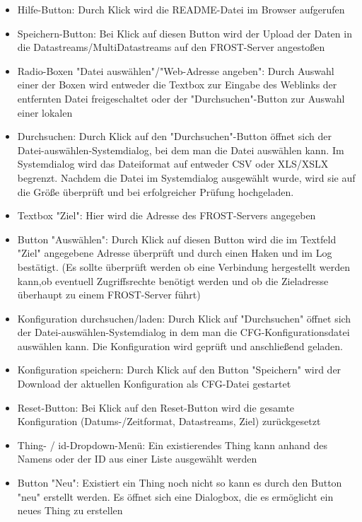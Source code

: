 \documentclass[12 pt]{article}
\begin{document}
\newpage

\begin{itemize}


\item Hilfe-Button: Durch Klick wird die README-Datei im Browser aufgerufen
\item Speichern-Button: Bei Klick auf diesen Button wird der Upload der Daten in die Datastreams/MultiDatastreams auf den FROST-Server angestoßen

\item Radio-Boxen "Datei auswählen"/"Web-Adresse angeben": Durch Auswahl einer der Boxen wird entweder die Textbox zur Eingabe des Weblinks der entfernten Datei freigeschaltet oder der "Durchsuchen"-Button zur Auswahl einer lokalen
\item Durchsuchen: Durch Klick auf den "Durchsuchen"-Button öffnet sich der Datei-auswählen-Systemdialog, bei dem man die Datei auswählen kann. Im Systemdialog wird das Dateiformat auf entweder CSV oder XLS/XSLX begrenzt. Nachdem die Datei im Systemdialog ausgewählt wurde, wird sie auf die Größe überprüft und bei erfolgreicher Prüfung hochgeladen.

\item Textbox "Ziel": Hier wird die Adresse des FROST-Servers angegeben
\item Button "Auswählen": Durch Klick auf diesen Button wird die im Textfeld "Ziel" angegebene Adresse überprüft und durch einen Haken und im Log bestätigt. (Es sollte überprüft werden ob eine Verbindung hergestellt werden kann,ob eventuell Zugriffsrechte benötigt werden und ob die Zieladresse überhaupt zu einem FROST-Server führt) 

\item Konfiguration durchsuchen/laden: Durch Klick auf "Durchsuchen" öffnet sich der Datei-auswählen-Systemdialog in dem man die CFG-Konfigurationsdatei auswählen kann. Die Konfiguration wird geprüft und anschließend geladen.
\item Konfiguration speichern: Durch Klick auf den Button "Speichern" wird der Download der aktuellen Konfiguration als CFG-Datei gestartet
\item Reset-Button: Bei Klick auf den Reset-Button wird die gesamte Konfiguration (Datums-/Zeitformat, Datastreams, Ziel) zurückgesetzt

\item Thing- / id-Dropdown-Menü: Ein existierendes Thing kann anhand des Namens oder der ID aus einer Liste ausgewählt werden
\item Button "Neu": Existiert ein Thing noch nicht so kann es durch den Button "neu" erstellt werden. Es öffnet sich eine Dialogbox, die es ermöglicht ein neues Thing zu erstellen


\end{itemize}
\end{document}
